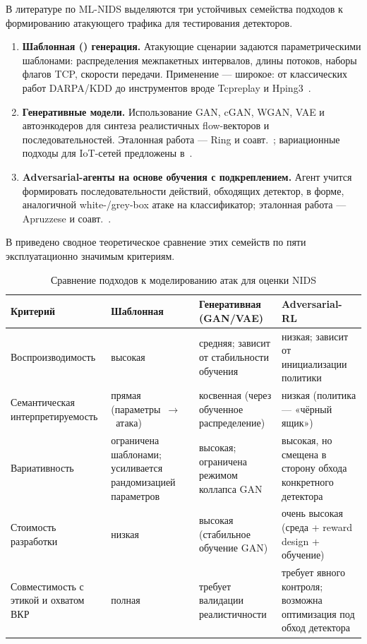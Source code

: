 В литературе по ML-NIDS выделяются три устойчивых семейства подходов к
формированию атакующего трафика для тестирования детекторов.

\begin{enumerate}
    \item \textbf{Шаблонная () генерация.}
    Атакующие сценарии задаются параметрическими шаблонами: распределения
    межпакетных интервалов, длины потоков, наборы флагов TCP, скорости
    передачи. Применение --- широкое: от классических работ DARPA/KDD до
    инструментов  вроде Tcpreplay и
    Hping3~\cite{lippmann2000darpa, gharib2016evalframework}.
    \item \textbf{Генеративные модели.} Использование GAN, cGAN, WGAN,
    VAE и автоэнкодеров для синтеза реалистичных flow-векторов и
    последовательностей. Эталонная работа --- Ring и
    соавт.~\cite{ring2019flowgan}; вариационные подходы для IoT-сетей
    предложены в~\cite{lopez2017cvae}.
    \item \textbf{Adversarial-агенты на основе обучения с подкреплением.}
    Агент учится формировать последовательности действий, обходящих
    детектор, в форме, аналогичной white-/grey-box атаке на классификатор;
    эталонная работа --- Apruzzese и соавт.~\cite{apruzzese2020adversarial}.
\end{enumerate}

В  приведено сводное теоретическое сравнение
этих семейств по пяти эксплуатационно значимым критериям.

\begin{table}[H]
\centering
\caption{Сравнение подходов к моделированию атак для оценки NIDS}
\label{tab:attacker-approaches}
\renewcommand{\arraystretch}{1.2}
\begin{tabularx}{\linewidth}{@{}lXXX@{}}
\toprule
\textbf{Критерий} & \textbf{Шаблонная} & \textbf{Генеративная (GAN/VAE)} &
\textbf{Adversarial-RL} \\
\midrule
Воспроизводимость       & высокая  & средняя; зависит от стабильности обучения &
низкая; зависит от инициализации политики \\
\addlinespace
Семантическая
интерпретируемость      & прямая (параметры~$\to$~атака) & косвенная (через
обученное распределение) & низкая (политика — «чёрный ящик») \\
\addlinespace
Вариативность           & ограничена шаблонами; усиливается рандомизацией параметров &
высокая; ограничена режимом коллапса GAN & высокая, но смещена в сторону
обхода конкретного детектора \\
\addlinespace
Стоимость разработки    & низкая & высокая (стабильное обучение GAN) &
очень высокая (среда + reward design + обучение) \\
\addlinespace
Совместимость с этикой
и охватом ВКР           & полная & требует валидации реалистичности & требует
явного контроля; возможна оптимизация под обход детектора \\
\bottomrule
\end{tabularx}
\end{table}

